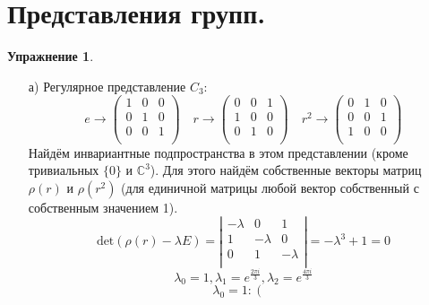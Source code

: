 \documentclass[12pt]{article}
\theoremstyle{definition}
\newtheorem{upr}[zad]{Упражнение}
\begin{document}
\section{Представления групп.}
\begin{upr}
\begin{itemize}
    \item[а)] Регулярное представление $C_3$:
    \begin{equation}
        e\rightarrow
        \left(
    \begin{array}{ccc}
    1 & 0 & 0\\
    0 & 1 & 0\\
    0 & 0 & 1\\
    \end{array}
    \right)\quad r\rightarrow
        \left(
    \begin{array}{ccc}
    0 & 0 & 1\\
    1 & 0 & 0\\
    0 & 1 & 0\\
    \end{array}
    \right)\quad r^2\rightarrow
        \left(
    \begin{array}{ccc}
    0 & 1 & 0\\
    0 & 0 & 1\\
    1 & 0 & 0\\
    \end{array}
    \right)
    \end{equation}
    Найдём инвариантные подпространства в этом представлении (кроме тривиальных $\{0\}$ и $\mathbb{C}^3$). Для этого найдём собственные векторы матриц $\rho(r)$ и $\rho(r^2)$ (для единичной матрицы любой вектор собственный с собственным значением 1).
    \begin{equation}
        \text{det}(\rho(r)-\lambda E)=\left|
    \begin{array}{ccc}
    -\lambda & 0 & 1\\
    1 & -\lambda & 0\\
    0 & 1 & -\lambda\\
    \end{array}
    \right|=-\lambda^3+1=0
    \end{equation}
    \begin{equation}
        \lambda_0=1, \lambda_1=e^{\frac{2\pi i}{3}}, \lambda_2=e^{\frac{4\pi i}{3}}
    \end{equation}
    \begin{equation}
        \lambda_0=1: \left(
    \begin{array}{ccc}

\end{array}
\end{equation}
\end{itemize}
\end{upr}
\end{document}
